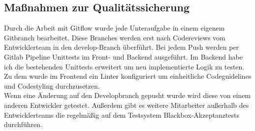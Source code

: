\subsection{Maßnahmen zur Qualitätssicherung}
\label{qualitaetssicherung}
Durch die Arbeit mit Gitflow wurde jede Unteraufgabe in einem eigenem Gitbranch bearbeitet. Diese Branches werden erst nach Codereviews vom Entwicklerteam in den develop-Branch überführt. Bei jedem Push werden per Gitlab Pipeline Unittests im Front- und Backend ausgeführt. Im Backend habe ich die bestehenden Unittests erweitert um neu implementierte Logik zu testen. Zu dem wurde im Frontend ein \gls{Linter} konfiguriert um einheitliche Codeguidelines und Codestyling durchzusetzen.\\
Wenn eine Änderung auf den Developbranch gepusht wurde wird diese von einem anderen Entwickler getestet. Außerdem gibt es weitere Mitarbeiter außerhalb des Entwicklerteams die regelmäßig auf dem Testsystem Blackbox-Akzeptanztests durchführen.